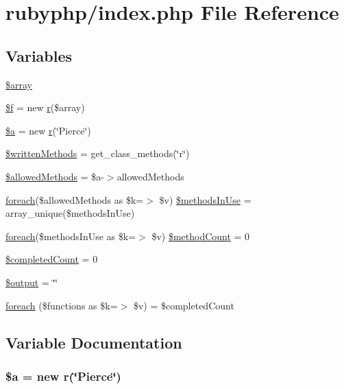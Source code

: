 \hypertarget{index_8php}{\section{rubyphp/index.php File Reference}
\label{index_8php}
}
\subsection*{Variables}
\begin{DoxyCompactItemize}
\item 
\hyperlink{index_8php_ac1361b8d873c1f927b21b809f99e5752}{\$array}
\item 
\hyperlink{index_8php_a23c42e7d231a63025b55e4eb7e3d4c99}{\$f} = new \hyperlink{classr}{r}(\$array)
\item 
\hyperlink{index_8php_acebf83966ef6d7e5645a6b62ba368f9f}{\$a} = new \hyperlink{classr}{r}(\char`\"{}Pierce\char`\"{})
\item 
\hyperlink{index_8php_a2e64f0494f7eccf90168af7f67198650}{\$written\-Methods} = get\-\_\-class\-\_\-methods(\char`\"{}r\char`\"{})
\item 
\hyperlink{index_8php_ab278eba7cab5341dacdccecd7a2cc2df}{\$allowed\-Methods} = \$a-\/$>$allowed\-Methods
\item 
\hyperlink{index_8php_a1b77627b646134ac307a24cf90261ebb}{foreach}(\$allowed\-Methods as \$k=$>$ \$v) \hyperlink{index_8php_a1c475c0c53206fb15c4c3028bb7d5c7c}{\$methods\-In\-Use} = array\-\_\-unique(\$methods\-In\-Use)
\item 
\hyperlink{index_8php_a1b77627b646134ac307a24cf90261ebb}{foreach}(\$methods\-In\-Use as \$k=$>$ \$v) \hyperlink{index_8php_a56c1b7384519355df73a254a12f0bae3}{\$method\-Count} = 0
\item 
\hyperlink{index_8php_a51c734a41c7747051953ec3d78dd1c5b}{\$completed\-Count} = 0
\item 
\hyperlink{index_8php_a73004ce9cd673c1bfafd1dc351134797}{\$output} = \char`\"{}\char`\"{}
\item 
\hyperlink{index_8php_a1b77627b646134ac307a24cf90261ebb}{foreach} (\$functions as \$k=$>$ \$v) = \$completed\-Count
\end{DoxyCompactItemize}


\subsection{Variable Documentation}
\hypertarget{index_8php_acebf83966ef6d7e5645a6b62ba368f9f}{
\subsubsection[{\$a}]{\setlength{\rightskip}{0pt plus 5cm}\$a = new {\bf r}(\char`\"{}Pierce\char`\"{})}}\label{index_8php_acebf83966ef6d7e5645a6b62ba368f9f}


